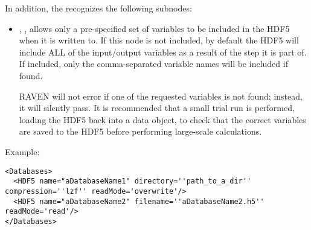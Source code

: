 In addition, the  recognizes the following subnodes:
\begin{itemize}
  \itemsep0em
  \item {}, , allows only a pre-specified set of variables to be
    included in the HDF5 when it is written to.  If this node is not included, by default the HDF5 will
    include ALL of the input/output variables as a result of the step it is part of.  If included, only the
    comma-separated variable names will be included if found.

    \nb RAVEN will not error if one of the requested variables is not found; instead, it will silently pass.
    It is recommended that a small trial run is performed, loading the HDF5 back into a data object, to check
    that the correct variables are saved to the HDF5 before performing large-scale calculations.
\end{itemize}


Example:
\begin{lstlisting}[style=XML,morekeywords={directory,filename}]
<Databases>
  <HDF5 name="aDatabaseName1" directory=''path_to_a_dir'' compression=''lzf'' readMode='overwrite'/>
  <HDF5 name="aDatabaseName2" filename=''aDatabaseName2.h5'' readMode='read'/>
</Databases>
\end{lstlisting}
